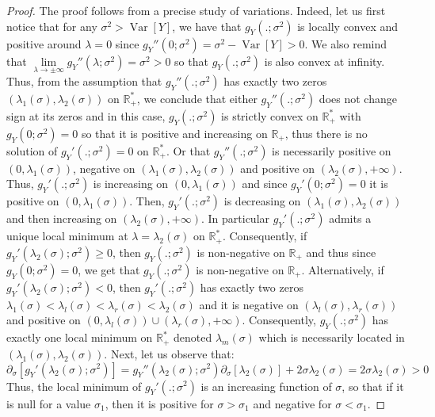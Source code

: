 \documentclass[a4paper, 10pt]{article}
\newcommand{\beq}{\begin{equation}}
\newcommand{\eeq}{\end{equation}}
\theoremstyle{definition}
\begin{document}
\begin{proof}The proof follows from a precise study of variations. Indeed, let us first notice that for any $\sigma^2>\operatorname{Var}[Y]$, we have that $g_Y(.;\sigma^2)$ is locally convex and positive around $\lambda=0$ since $g_Y''(0;\sigma^2)=\sigma^2-\operatorname{Var}[Y]>0$. We also remind that $\underset{\lambda\to \pm \infty}{\lim} g_Y''(\lambda;\sigma^2)=\sigma^2>0$ so that $g_Y(.;\sigma^2)$ is also convex at infinity. Thus, from the assumption that $g_Y''(.;\sigma^2)$ has exactly two zeros $(\lambda_1(\sigma),\lambda_2(\sigma))$ on $\mathbb{R}_+^*$, we conclude that either $g_Y''(.;\sigma^2)$ does not change sign at its zeros and in this case, $g_Y(.;\sigma^2)$ is strictly convex on $\mathbb{R}_+^*$ with $g_Y(0;\sigma^2)=0$ so that it is positive and increasing on $\mathbb{R}_+$, thus there is no solution of $g_Y'(.;\sigma^2)=0$ on $\mathbb{R}_+^*$. Or that $g_Y''(.;\sigma^2)$ is necessarily positive on $(0,\lambda_1(\sigma))$, negative on $(\lambda_1(\sigma),\lambda_2(\sigma))$ and positive on $(\lambda_2(\sigma),+\infty)$. Thus, $g_Y'(.;\sigma^2)$ is increasing on $(0,\lambda_1(\sigma))$ and since $g_Y'(0;\sigma^2)=0$ it is positive on $(0,\lambda_1(\sigma))$. Then, $g_Y'(.;\sigma^2)$ is decreasing on $(\lambda_1(\sigma),\lambda_2(\sigma))$ and then increasing on $(\lambda_2(\sigma),+\infty)$. In particular $g_Y'(.;\sigma^2)$ admits a unique local minimum at $\lambda=\lambda_2(\sigma)$ on $\mathbb{R}_+^*$. Consequently, if $g_Y'(\lambda_2(\sigma);\sigma^2)\geq 0$, then $g_Y(.;\sigma^2)$ is non-negative on $\mathbb{R}_+$ and thus since $g_Y(0;\sigma^2)=0$, we get that $g_Y(.;\sigma^2)$ is non-negative on $\mathbb{R}_+$. Alternatively, if $g_Y'(\lambda_2(\sigma);\sigma^2)<0$, then $g_Y'(.;\sigma^2)$ has exactly two zeros $\lambda_1(\sigma)<\lambda_l(\sigma)<\lambda_r(\sigma)<\lambda_2(\sigma)$ and it is negative on $(\lambda_l(\sigma),\lambda_r(\sigma))$ and positive on $(0,\lambda_l(\sigma))\cup(\lambda_r(\sigma),+\infty)$. Consequently, $g_Y(.;\sigma^2)$ has exactly one local minimum on $\mathbb{R}_+^*$ denoted $\lambda_m(\sigma)$ which is necessarily located in  $(\lambda_1(\sigma),\lambda_2(\sigma))$.
Next, let us observe that:
\beq \partial_\sigma[g_Y'(\lambda_2(\sigma);\sigma^2)]=g_Y''(\lambda_2(\sigma);\sigma^2) \partial_\sigma[\lambda_2(\sigma)]+ 2\sigma\lambda_2(\sigma)=2\sigma\lambda_2(\sigma)>0\eeq
Thus, the local minimum of $g_Y'(.;\sigma^2)$ is an increasing function of $\sigma$, so that if it is null for a value $\sigma_1$, then it is positive for $\sigma>\sigma_1$ and negative for $\sigma<\sigma_1$.

\end{proof}
\end{document}
